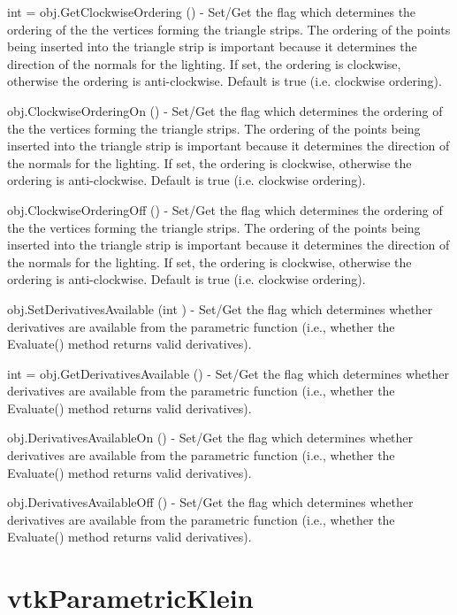 \begin{DoxyItemize}
\item {\ttfamily int = obj.\-Get\-Clockwise\-Ordering ()} -\/ Set/\-Get the flag which determines the ordering of the the vertices forming the triangle strips. The ordering of the points being inserted into the triangle strip is important because it determines the direction of the normals for the lighting. If set, the ordering is clockwise, otherwise the ordering is anti-\/clockwise. Default is true (i.\-e. clockwise ordering).  
\item {\ttfamily obj.\-Clockwise\-Ordering\-On ()} -\/ Set/\-Get the flag which determines the ordering of the the vertices forming the triangle strips. The ordering of the points being inserted into the triangle strip is important because it determines the direction of the normals for the lighting. If set, the ordering is clockwise, otherwise the ordering is anti-\/clockwise. Default is true (i.\-e. clockwise ordering).  
\item {\ttfamily obj.\-Clockwise\-Ordering\-Off ()} -\/ Set/\-Get the flag which determines the ordering of the the vertices forming the triangle strips. The ordering of the points being inserted into the triangle strip is important because it determines the direction of the normals for the lighting. If set, the ordering is clockwise, otherwise the ordering is anti-\/clockwise. Default is true (i.\-e. clockwise ordering).  
\item {\ttfamily obj.\-Set\-Derivatives\-Available (int )} -\/ Set/\-Get the flag which determines whether derivatives are available from the parametric function (i.\-e., whether the Evaluate() method returns valid derivatives).  
\item {\ttfamily int = obj.\-Get\-Derivatives\-Available ()} -\/ Set/\-Get the flag which determines whether derivatives are available from the parametric function (i.\-e., whether the Evaluate() method returns valid derivatives).  
\item {\ttfamily obj.\-Derivatives\-Available\-On ()} -\/ Set/\-Get the flag which determines whether derivatives are available from the parametric function (i.\-e., whether the Evaluate() method returns valid derivatives).  
\item {\ttfamily obj.\-Derivatives\-Available\-Off ()} -\/ Set/\-Get the flag which determines whether derivatives are available from the parametric function (i.\-e., whether the Evaluate() method returns valid derivatives).  
\end{DoxyItemize}\hypertarget{vtkcommon_vtkparametricklein}{}\section{vtk\-Parametric\-Klein}\label{vtkcommon_vtkparametricklein}
